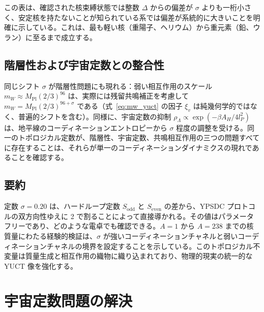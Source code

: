 \documentclass[11pt,a4paper]{article}
\theoremstyle{remark}
\begin{document}
	この表は、確認された核束縛状態では整数 \(\Delta\) からの偏差が \(\sigma\) よりも一桁小さく、安定核を持たないことが知られている系では偏差が系統的に大きいことを明確に示している。これは、最も軽い核（重陽子、ヘリウム）から重元素（鉛、ウラン）に至るまで成立する。
	
	\subsection{階層性および宇宙定数との整合性}
	
	同じシフト \(\sigma\) が階層性問題にも現れる：弱い相互作用のスケール \(m_W \approx M_{\mathrm{Pl}}(2/3)^{96}\) は、実際には残留共鳴補正を考慮して \(m_W = M_{\mathrm{Pl}} (2/3)^{96+\sigma}\) である（式~\ref{eq:mw_yuct} の因子 \(\xi_v\) は純幾何学的ではなく、普遍的シフトを含む）。同様に、宇宙定数の抑制 \(\rho_\Lambda \propto \exp(-\beta A_H/4l_P^2)\) は、地平線のコーディネーションエントロピーから \(\sigma\) 程度の調整を受ける。同一のトポロジカル定数が、階層性、宇宙定数、共鳴相互作用の三つの問題すべてに存在することは、それらが単一のコーディネーションダイナミクスの現れであることを確認する。
	
	\subsection{要約}
	
	定数 \(\sigma = 0.20\) は、ハードループ定数 \(S_{\mathrm{odd}}\) と \(S_{\mathrm{even}}\) の差から、YPSDC プロトコルの双方向性ゆえに 2 で割ることによって直接導かれる。その値はパラメータフリーであり、どのような電卓でも確認できる。\(A=1\) から \(A=238\) までの核質量にわたる経験的検証は、\(\sigma\) が強いコーディネーションチャネルと弱いコーディネーションチャネルの境界を設定することを示している。このトポロジカル不変量は質量生成と相互作用の織物に織り込まれており、物理的現実の統一的な YUCT 像を強化する。
	
	\section{宇宙定数問題の解決}
	
\end{document}
